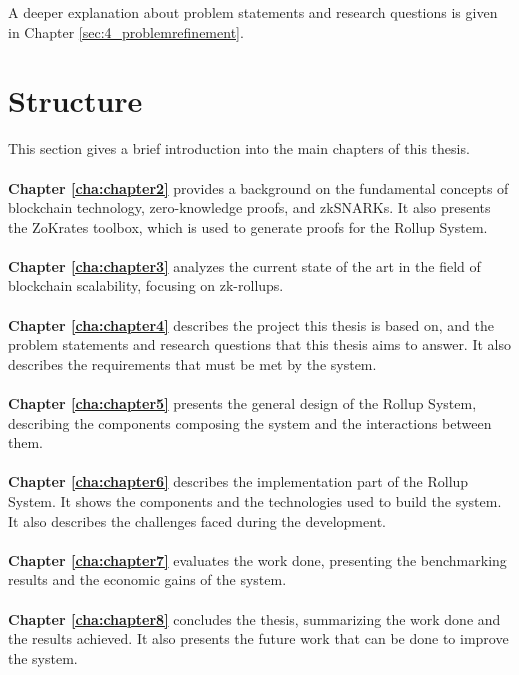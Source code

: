 A deeper explanation about problem statements and research questions is given in Chapter \ref{sec:4_problemrefinement}.

\section{Structure\label{sec:structure}}

This section gives a brief introduction into the main chapters of this thesis.
\\
\\
\textbf{Chapter \ref{cha:chapter2}} provides a background on the fundamental concepts of blockchain technology, zero-knowledge proofs, and zkSNARKs. It also presents the ZoKrates toolbox, which is used to generate proofs for the Rollup System.
\\
\\
\textbf{Chapter \ref{cha:chapter3}} analyzes the current state of the art in the field of blockchain scalability, focusing on zk-rollups.
\\
\\
\textbf{Chapter \ref{cha:chapter4}} describes the project this thesis is based on, and the problem statements and research questions that this thesis aims to answer. It also describes the requirements that must be met by the system.
\\
\\
\textbf{Chapter \ref{cha:chapter5}} presents the general design of the Rollup System, describing the components composing the system and the interactions between them.
\\
\\
\textbf{Chapter \ref{cha:chapter6}} describes the implementation part of the Rollup System. It shows the components and the technologies used to build the system. It also describes the challenges faced during the development.
\\
\\
\textbf{Chapter \ref{cha:chapter7}} evaluates the work done, presenting the benchmarking results and the economic gains of the system.
\\
\\
\textbf{Chapter \ref{cha:chapter8}} concludes the thesis, summarizing the work done and the results achieved. It also presents the future work that can be done to improve the system.
